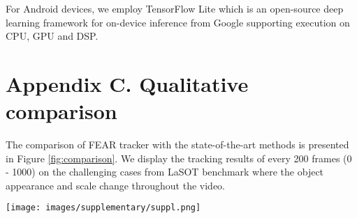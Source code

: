 \documentclass[runningheads]{llncs}
\begin{document}
For Android devices, we employ TensorFlow Lite \cite{tensorflow2015-whitepaper} which is an open-source deep learning framework for on-device inference from Google supporting execution on CPU, GPU and DSP.

\section*{Appendix C. Qualitative comparison}
The comparison of FEAR tracker with the state-of-the-art methods is presented in Figure \ref{fig:comparison}. We display the tracking results of every 200 frames (0 - 1000) on the challenging cases from LaSOT benchmark where the object appearance and scale change throughout the video. 

\begin{figure*}[htp!]\centering
  \texttt{[image: images/supplementary/suppl.png]} \\
   \caption{Qualitative comparison of FEAR tracker with state-of-the-art methods on challenging cases of variations in tracked object appearance from LaSOT benchmark \cite{LaSOT}. \textcolor{green}{Green}: Ground Truth, \textcolor{red}{Red}: FEAR-L, \textcolor{yellow}{Yellow}: STARK Lightning, \textcolor{blue}{Blue}: Ocean, \textcolor{purple}{Purple}: Stark-ST50.}
   \label{fig:comparison}
\end{figure*}
\end{document}
